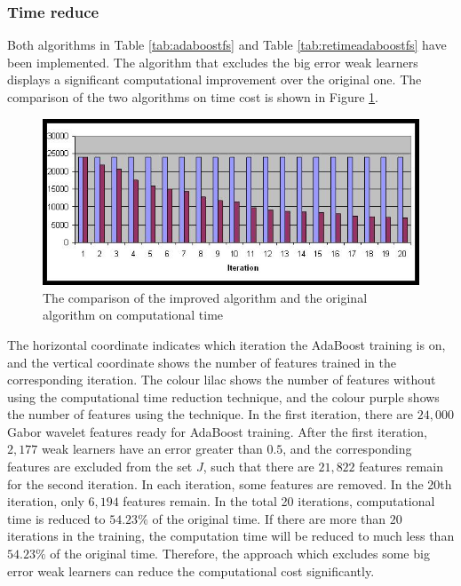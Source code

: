 \subsubsection{Time reduce}
Both algorithms in \mbox{Table} \ref{tab:adaboostfs} and \mbox{Table} \ref{tab:retimeadaboostfs} have been implemented. The algorithm that excludes the big error weak learners displays a significant computational improvement over the original one. The comparison of the two algorithms on time cost is shown in \mbox{Figure} \ref{fig:comparison}. 
\begin{figure}[ht]
\begin{center}
  \includegraphics[width=\textwidth]{ch4/figures/comparison.jpg}
\caption{The comparison of the improved algorithm and the original algorithm on computational time}
\label{fig:comparison}
\end{center}
\end{figure} 
The horizontal coordinate indicates which iteration the AdaBoost training is on, and the vertical coordinate shows the number of features trained in the corresponding iteration. The colour lilac shows the number of features without using the computational time reduction technique, and the colour purple shows the number of features using the technique. In the first iteration, there are $24,000$ Gabor wavelet features ready for AdaBoost training. After the first iteration, $2,177$ weak learners have an error greater than $0.5$, and the corresponding features are excluded from the set $J$, such that there are $21,822$ features remain for the second iteration. In each iteration, some features are removed. In the 20th iteration, only $6,194$ features remain. In the total 20 iterations, computational time is reduced to $54.23\%$ of the original time. If there are more than $20$ iterations in the training, the computation time will be reduced to much less than $54.23\%$ of the original time. Therefore, the approach which excludes some big error weak learners can reduce the computational cost significantly.

